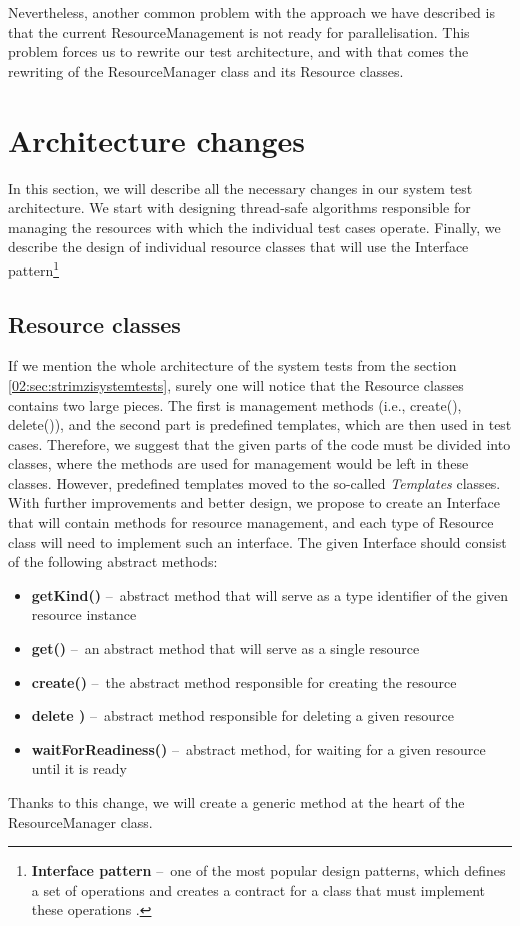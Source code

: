 Nevertheless, another common problem with the approach we have described is that the current ResourceManagement is not ready for parallelisation. This problem forces us to rewrite our test architecture, and with that comes the rewriting of the ResourceManager class and its Resource classes.

\section{Architecture changes}
\label{04:architecturechanges}

In this section, we will describe all the necessary changes in our system test architecture. We start with designing thread-safe algorithms responsible for managing the resources with which the individual test cases operate. Finally, we describe the design of individual resource classes that will use the Interface pattern\footnote{\textbf{Interface pattern} \---\ one of the most popular design patterns, which defines a set of operations and creates a contract for a class that must implement these operations .}

\subsection{Resource classes}

If we mention the whole architecture of the system tests from the section \ref{02:sec:strimzisystemtests}, surely one will notice that the Resource classes contains two large pieces. The first is management methods (i.e., create(), delete()), and the second part is predefined templates, which are then used in test cases. Therefore, we suggest that the given parts of the code must be divided into classes, where the methods are used for management would be left in these classes. However, predefined templates moved to the so-called \emph{Templates} classes. With further improvements and better design, we propose to create an Interface that will contain methods for resource management, and each type of Resource class will need to implement such an interface. The given Interface should consist of the following abstract methods:
\begin{itemize}[itemsep = 1mm, parsep = 0pt]
    \item \textbf {getKind()} \---\ abstract method that will serve as a type identifier of the given resource instance
    \item \textbf {get()} \---\ an abstract method that will serve as a single resource
    \item \textbf {create()} \---\ the abstract method responsible for creating the resource
    \item \textbf {delete )} \---\ abstract method responsible for deleting a given resource
    \item \textbf {waitForReadiness()} \---\ abstract method, for waiting for a given resource until it is ready
\end{itemize}
Thanks to this change, we will create a generic method at the heart of the ResourceManager class.

